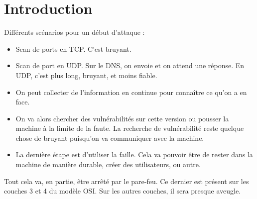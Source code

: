 \section{Introduction}
Différents scénarios pour un début d'attaque :
\begin{itemize}
 \item Scan de ports en TCP. C'est bruyant.
 \item Scan de port en UDP. Sur le DNS, on envoie et on attend une réponse. En UDP, c'est plus long, bruyant, et moins fiable.
 \item On peut collecter de l'information en continue pour connaître ce qu'on a en face.
 \item On va alors chercher des vulnérabilités sur cette version ou pousser la machine à la limite de la faute. La recherche de vulnérabilité reste quelque chose de bruyant puisqu'on va communiquer avec la machine.
 \item La dernière étape est d'utiliser la faille. Cela va pouvoir être de rester dans la machine de manière durable, créer des utilisateurs, ou autre.
\end{itemize}
Tout cela va, en partie, être arrêté par le pare-feu. Ce dernier est présent sur les couches 3 et 4 du modèle OSI. Sur les autres couches, il sera presque aveugle.

